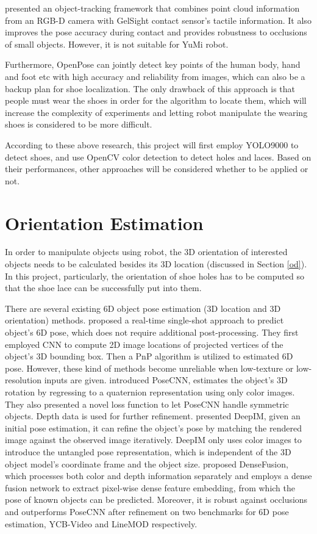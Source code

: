 \citep{vision_touch} presented an object-tracking framework that combines point cloud information from an RGB-D camera with GelSight contact sensor's tactile information. It also improves the pose accuracy during contact and provides robustness to occlusions of small objects. However, it is not suitable for YuMi robot.

Furthermore, OpenPose \citep{openpose} can jointly detect key points of the human body, hand and foot etc with high accuracy and reliability from images, which can also be a backup plan for shoe localization. The only drawback of this approach is that people must wear the shoes in order for the algorithm to locate them, which will increase the complexity of experiments and letting robot manipulate the wearing shoes is considered to be more difficult.

According to these above research, this project will first employ YOLO9000 to detect shoes, and use OpenCV color detection to detect holes and laces. Based on their performances, other approaches will be considered whether to be applied or not.

\section{Orientation Estimation}
In order to manipulate objects using robot, the 3D orientation of interested objects needs to be calculated besides its 3D location (discussed in Section \ref{od}). In this project, particularly, the orientation of shoe holes has to be computed so that the shoe lace can be successfully put into them.

There are several existing 6D object pose estimation (3D location and 3D orientation) methods. \citep{singleshot} proposed a real-time single-shot approach to predict object's 6D pose, which does not require additional post-processing. They first employed CNN to compute 2D image locations of projected vertices of the object’s 3D bounding box. Then a PnP algorithm is utilized to estimated 6D pose. However, these kind of methods become unreliable when low-texture or low-resolution inputs are given. \citep{PoseCNN} introduced PoseCNN, estimates the object's 3D rotation by regressing to a quaternion representation using only color images. They also presented a novel loss function to let PoseCNN handle symmetric objects. Depth data is used for further refinement. \citep{DeepIM} presented DeepIM, given an initial pose estimation, it can refine the object's pose by matching the rendered image against the observed image iteratively. DeepIM only uses color images to introduce the untangled pose representation, which is independent of the 3D object model's coordinate frame and the object size. \citep{DenseFusion} proposed DenseFusion, which processes both color and depth information separately and employs a dense fusion network to extract pixel-wise dense feature embedding, from which the pose of known objects can be predicted. Moreover, it is robust against occlusions and outperforms PoseCNN after refinement on two benchmarks for 6D pose estimation, YCB-Video \citep{PoseCNN} and LineMOD \citep{linemod} respectively.

